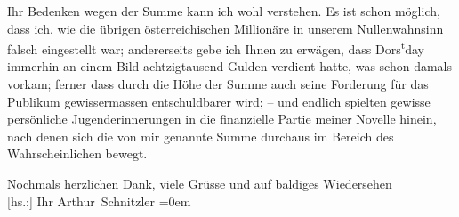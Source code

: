\pstart
           Ihr Bedenken wegen der Summe kann ich wohl verstehen. Es ist schon möglich, dass ich,
               wie die übrigen österreichischen Millionäre in
               unserem Nullenwahnsinn \label{K_L03754-3v}\label{K_L03754-3} falsch
               eingestellt war; andererseits gebe ich Ihnen zu erwägen, dass Dors\substVorne{}\textsuperscript{t}\substDazwischen{}d\substHinten{}ay immerhin an einem Bild achtzigtausend Gulden verdient hatte, was schon
               damals vorkam; ferner dass durch die Höhe der Summe auch seine Forderung für das
               Publikum gewissermassen entschuldbarer wird; – und endlich spielten gewisse
               persönliche Jugenderinnerungen in die finanzielle Partie meiner Novelle hinein, nach denen sich die von mir
               genannte Summe durchaus im Bereich des Wahrscheinlichen bewegt.\pend
           
\pstart
           Nochmals herzlichen Dank, viele Grüsse und auf baldiges Wiedersehen{\\[\baselineskip]}{[}hs.:{]} Ihr \spacefill\mbox{Arthur Schnitzler}\pend
           \leftskip=0em{}\endnumbering{}  \newcommand{\dateiname}{L03754}\newcommand{\titel}{Arthur Schnitzler an Stefan Zweig, 6. 11. 1924}\newcommand{\editorInnen}{Selma Jahnke und Martin Anton Müller}
